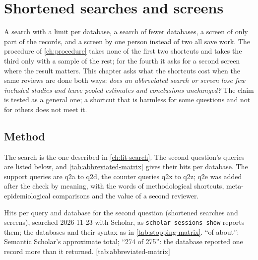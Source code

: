 \chapter{Shortened searches and screens}
\label{ch:abbreviated}


A search with a limit per database, a search of fewer databases, a
screen of only part of the records, and a screen by one person instead
of two all save work.
The procedure of \cref{ch:procedure} takes none of the first two
shortcuts and takes the third only with a sample of the rest; for the
fourth it asks for a second screen where the result matters.
This chapter asks what the shortcuts cost when the same reviews are done
both ways: \emph{does an abbreviated search or screen lose few included
studies and leave pooled estimates and conclusions unchanged?}
The claim is tested as a general one; a shortcut that is harmless for
some questions and not for others does not meet it.

\section{Method}
\label{sec:abbreviated-method}

The search is the one described in \cref{ch:lit-search}.
The second question's queries are listed below, and
\cref{tab:abbreviated-matrix} gives their hits per database.
The support queries are q2a to q2d, the counter queries q2x to q2z; q2e
was added after the check by meaning, with the words of methodological
shortcuts, meta-epidemiological comparisons and the value of a second
reviewer.


\begin{table}
  \begin{sidecaption}{%
      Hits per query and database for the second question (shortened
      searches and screens), searched 2026-11-23 with Scholar, as
      \texttt{scholar sessions show} reports them; the databases and
      their syntax as in \cref{tab:stopping-matrix}.
      \enquote{of about}: Semantic Scholar's approximate total;
      \enquote{274 of 275}: the database reported one record more than
      it returned.
    }[tab:abbreviated-matrix]
    \footnotesize
    
  \end{sidecaption}
\end{table}

